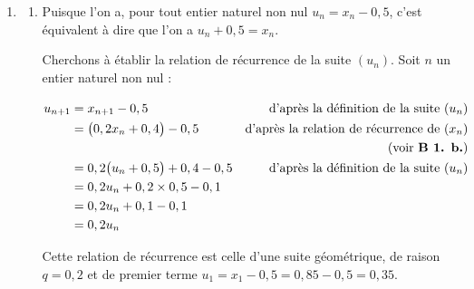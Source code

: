 \documentclass[10pt]{article}
\begin{document}
\begin{enumerate}
\begin{enumerate}

$R_n$ et $\overline{R_n}$ partitionnant l'univers, d'après la loi des probabilités totales, on a :

$\begin{aligned}[t] x_{n+1} &= P(R_{n+1}) \\
&= P\big(R_{n+1} \cap R_n\big)P\big(R_{n+1} \cap \overline{R_n}\big)\\
&= x_n \times 0,6 + (1 - x_n)\times 0,4 \\
&= 0,6 x_n + 0,4 - 0,4x_n \\
&= 0,2x_n + 0,4.\end{aligned}$

On a bien établi la relation de récurrence attendue pour la suite $(x_n)$.
	\end{enumerate}

	\item \begin{enumerate}
		\item Puisque l'on a, pour tout entier naturel non nul $u_n = x_n - 0,5$, c'est équivalent à dire que l'on a $u_n + 0,5 = x_n$.

		Cherchons à établir la relation de récurrence de la suite $(u_n)$. Soit $n$ un entier naturel non nul :

$\begin{aligned}[t] u_{n+1} &= x_{n+1} - 0,5 &\text{d'après la définition de la suite }(u_n)\\
&=\big(0,2 x_n + 0,4\big) -0,5&\text{d'après la relation de récurrence de }(x_n) \\
&&\text{ (voir \textbf{B 1. b.})}\\
&=0,2 \big(u_n + 0,5\big) + 0,4 - 0,5&\text{d'après la définition de la suite }(u_n)\\
&=0,2u_n + 0,2\times 0,5 - 0,1\\
&=0,2u_n + 0,1 - 0,1\\
&=0,2u_n\\ \end{aligned}$

Cette relation de récurrence est celle d'une suite géométrique, de raison $q= 0,2$ et de premier terme $u_1 = x_1 - 0,5 = 0,85 - 0,5 = 0,35$.


\end{enumerate}
\end{enumerate}
\end{document}
